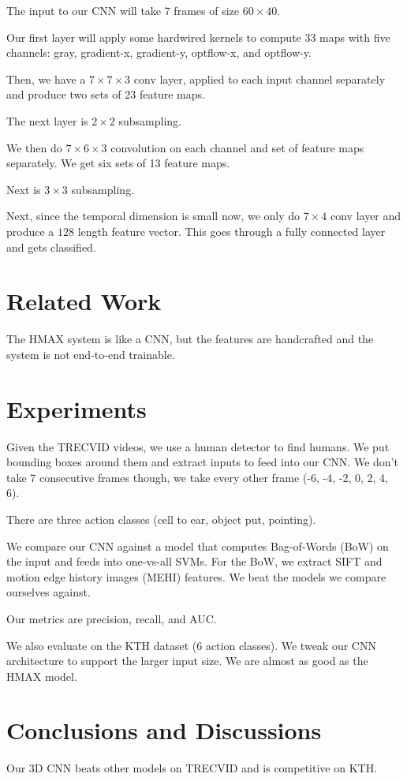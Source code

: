 \documentclass[a4paper]{article}
\begin{document}
The input to our CNN will take 7 frames of size $60 \times 40$.

Our first layer will apply some hardwired kernels to compute 33 maps with 
five channels: gray, gradient-x, gradient-y, optflow-x, and optflow-y.

Then, we have a $7 \times 7 \times 3$ conv layer, applied to each input channel
separately and produce two sets of 23 feature maps.

The next layer is $2 \times 2$ subsampling.

We then do $7 \times 6 \times 3$ convolution on each channel and set of feature
maps separately. We get six sets of 13 feature maps.

Next is $3 \times 3$ subsampling.

Next, since the temporal dimension is small now, we only do $7 \times 4$ conv
layer and produce a $128$ length feature vector. This goes through a fully
connected layer and gets classified.

\section{Related Work}
The HMAX system is like a CNN, but the features are handcrafted and the system 
is not end-to-end trainable.

\section{Experiments}
Given the TRECVID videos, we use a human detector to find humans. We put 
bounding boxes around them and extract inputs to feed into our CNN. We don't 
take 7 consecutive frames though, we take every other frame (-6, -4, -2, 0, 2, 
4, 6).

There are three action classes (cell to ear, object put, pointing).

We compare our CNN against a model that computes Bag-of-Words (BoW) on the 
input and feeds into one-vs-all SVMs. For the BoW, we extract SIFT and 
motion edge history images (MEHI) features. We beat the models we compare
ourselves against.

Our metrics are precision, recall, and AUC.

We also evaluate on the KTH dataset (6 action classes). We tweak our CNN
architecture to support the larger input size. We are almost as good as the 
HMAX model.

\section{Conclusions and Discussions}
Our 3D CNN beats other models on TRECVID and is competitive on KTH.
\end{document}
